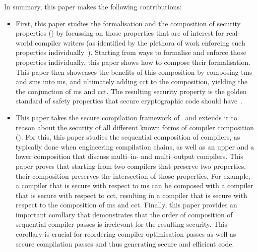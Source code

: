 \documentclass[utf8,acmsmall,review,screen,dvipsnames]{acmart}
\begin{document}
In summary, this paper makes the following contributions:
\begin{itemize}
  \item %
        First, this paper studies the formalisation and the composition of security properties () by focussing on those properties that are of interest for real-world compiler writers (as identified by the plethora of work enforcing such properties individually~\cite{akritidis2009baggy,nagarakatte2009soft,nagarakatte2010cets,dhumbumroong2020boundwarden,jung2021pico,nam2019framer,shankaranarayana2023tailcheck,younan2010paricheck,zhou2023fatptrs,bond2017vale,almeida2017jasmin,kuepper2023cryptopt,cauligi2019fact}).
        Starting from ways to formalise and enforce those properties individually, this paper shows how to compose their formalisation. %
        This paper then showcases the benefits of this composition by composing \gls{tms} and \gls{sms} into \gls{ms}, and ultimately adding \gls{cct} to the composition, yielding the the conjunction of \gls{ms} and \gls{cct}.
        The resulting security property is the golden standard of safety properties that secure cryptographic code should have~\cite{lemay2021ccc}.

  \item %
        This paper takes the secure compilation framework of~\citep{abate2019jour} and extends it to reason about the security of all different known forms of compiler composition ().
        For this, this paper studies the sequential composition of compilers, as typically done when engineering compilation chains, as well as an upper and a lower composition that discuss multi--in- and multi--output compilers.
        This paper proves that starting from two compilers that preserve two properties, their composition preserves the intersection of those properties.
        For example, a compiler that is secure with respect to \gls{ms} can be composed with a compiler that is secure with respect to \gls{cct}, resulting in a compiler that is secure with respect to the composition of \gls{ms} and \gls{cct}.
        Finally, this paper provides an important corollary that demonstrates that the order of composition of sequential compiler passes is irrelevant for the resulting security.
        This corollary is crucial for reordering compiler optimisation passes as well as secure compilation passes and thus generating secure and efficient code.


\end{itemize}
\end{document}
